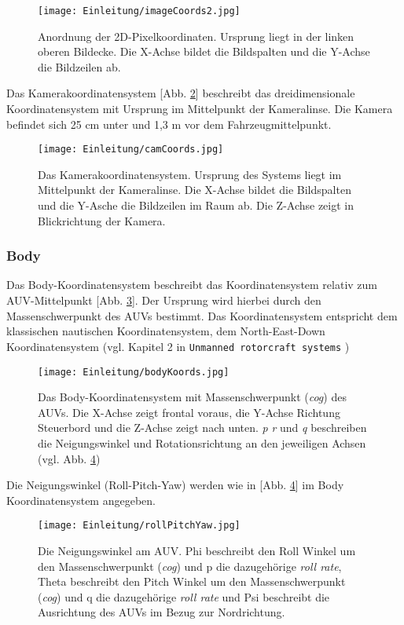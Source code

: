 \begin{figure}[H]
	\centering
	\texttt{[image: Einleitung/imageCoords2.jpg]}
	\caption[Das Bildkoordinatensystem]{Anordnung der 2D-Pixelkoordinaten. Ursprung liegt in der linken oberen Bildecke. Die X-Achse bildet die Bildspalten und die Y-Achse die Bildzeilen ab.}
	\label{imageKoords}
\end{figure}
Das Kamerakoordinatensystem [Abb. \ref{CamKoords}] beschreibt das dreidimensionale Koordinatensystem mit Ursprung im Mittelpunkt der Kameralinse. Die Kamera befindet sich 25 cm unter und 1,3 m vor dem Fahrzeugmittelpunkt.
\begin{figure}[H]
	\centering
	\texttt{[image: Einleitung/camCoords.jpg]}
	\caption[Das Kamerakoordinatensystem]{Das Kamerakoordinatensystem. Ursprung des Systems liegt im Mittelpunkt der Kameralinse. Die X-Achse bildet die Bildspalten und die Y-Asche die Bildzeilen im Raum ab. Die Z-Achse zeigt in Blickrichtung der Kamera.}
	\label{CamKoords}
\end{figure}

\subsubsection{Body}
Das Body-Koordinatensystem beschreibt das Koordinatensystem relativ zum AUV-Mittelpunkt [Abb. \ref{Abb. 1}].
Der Ursprung wird hierbei durch den Massenschwerpunkt des AUVs bestimmt.
Das Koordinatensystem entspricht dem klassischen nautischen Koordinatensystem, dem North-East-Down Koordinatensystem (vgl. Kapitel 2 in \texttt{Unmanned rotorcraft systems} \cite{cai2011unmanned})
\begin{figure}[H]
	\centering
	\texttt{[image: Einleitung/bodyKoords.jpg]}
	\caption[Das Body-Koordinatensystem]{Das Body-Koordinatensystem mit Massenschwerpunkt (\textit{cog}) des AUVs. Die X-Achse zeigt frontal voraus, die Y-Achse Richtung Steuerbord und die Z-Achse zeigt nach unten. \textit{p} \textit{r} und \textit{q} beschreiben die Neigungswinkel und Rotationsrichtung an den jeweiligen Achsen (vgl. Abb. \ref{Abb. 2})}
	\label{Abb. 1}
\end{figure}

Die Neigungswinkel (Roll-Pitch-Yaw) werden wie in [Abb. \ref{Abb. 2}] im Body Koordinatensystem angegeben.
\begin{figure}[H]
	\centering
	\texttt{[image: Einleitung/rollPitchYaw.jpg]}
	\caption[Die Neigungswinkel im Body-Koordinatensystem]{Die Neigungswinkel am AUV. Phi beschreibt den Roll Winkel um den Massenschwerpunkt (\textit{cog}) und p die dazugehörige \textit{roll rate},  Theta beschreibt den Pitch Winkel um den Massenschwerpunkt (\textit{cog}) und q die dazugehörige \textit{roll rate} und  Psi beschreibt die Ausrichtung des AUVs im Bezug zur Nordrichtung.}
	\label{Abb. 2}
\end{figure}
